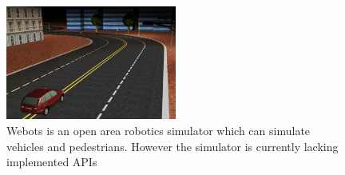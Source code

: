 \begin{figure}[H]
    \centering
    \includegraphics[width=0.5\textwidth]{03_Background/Appendix/Simulators/Webots.jpg}
    \caption[Webots]{Webots is an open area robotics simulator which can simulate vehicles and pedestrians. However the simulator is currently lacking implemented APIs}
\end{figure}

